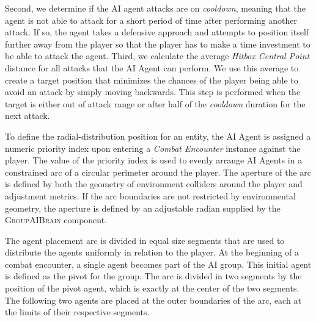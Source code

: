 
Second, we determine if the AI agent attacks are on \emph{cooldown}, meaning that the agent is not able to attack for a short period of time after performing another attack. If so, the agent takes a defensive approach and attempts to position itself further away from the player so that the player has to make a time investment to be able to attack the agent. Third, we calculate the average \emph{Hitbox Central Point} distance for all attacks that the AI Agent can perform. We use this average to create a target position that minimizes the chances of the player being able to avoid an attack by simply moving backwards. This step is performed when the target is either out of attack range or after half of the \emph{cooldown} duration for the next attack.

To define the radial-distribution position for an entity, the AI Agent is assigned a numeric priority index upon entering a \emph{Combat Encounter} instance against the player. The value of the priority index is used to evenly arrange AI Agents in a constrained arc of a circular perimeter around the player. The aperture of the arc is defined by both the geometry of environment colliders around the player and adjustment metrics. If the arc boundaries are not restricted by environmental geometry, the aperture is defined by an adjustable radian supplied by the \textsc{GroupAIBrain} component.

The agent placement arc is divided in equal size segments that are used to distribute the agents uniformly in relation to the player. At the beginning of a combat encounter, a single agent becomes part of the AI group. This initial agent is defined as the pivot for the group. The arc is divided in two segments by the position of the pivot agent, which is exactly at the center of the two segments. The following two agents are placed at the outer boundaries of the arc, each at the limits of their respective segments.

